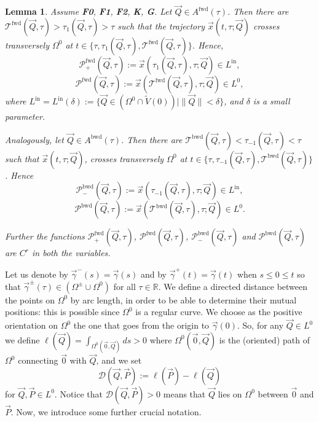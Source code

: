 \documentclass[10pt]{article}
\newtheorem{knownlemma}[knowntheorem]{Lemma}
\numberwithin{equation}{section}
\def\dist{{\mathscr{D}}}
\def\ga{\vec{\gamma}}
\def\de{\delta}
\def\Om{\Omega}
\def\R{{\mathbb R}}
\def\Q{\vec{Q}}
\def\P{\vec{P}}
\def\x{\vec{x}}
\newcommand\assump[1]{{\rm\textbf{#1}}}
\def\inn{\textrm{in}}
\theoremstyle{definition}
\theoremstyle{remark}
\begin{document}
    \begin{knownlemma}\label{L.loop}\cite[Lemma 3.6]{CFPRimut}
  Assume \assump{F0}, \assump{F1}, \assump{F2}, \assump{K}, \assump{G}.
    Let $\Q \in A^{\textrm{fwd}}(\tau)$. Then there are $\mathscr{T}^{\textrm{fwd}}(\Q,\tau)>\tau_1(\Q,\tau)>\tau$ such that
    the trajectory $\x(t,\tau; \Q) $
      crosses transversely $\Om^0$ at $t\in\{\tau, \tau_1(\Q,\tau), \mathscr{T}^{\textrm{fwd}}(\Q,\tau)\}$.
     Hence,
     $$\mathscr{P}^{\textrm{fwd}}_+(\Q,\tau):=\x(\tau_1(\Q,\tau),\tau; \Q) \in L^{\inn},$$
     $$\mathscr{P}^{\textrm{fwd}}(\Q,\tau):=\x(\mathscr{T}^{\textrm{fwd}}(\Q,\tau),\tau; \Q) \in
   L^0,$$
     where $L^{\inn}=L^{\inn}(\de):=\{\Q\in(\Om^0\cap\tilde{V}(0))\mid \|\Q\|<\de\}$, and $\de$ is a small parameter.

    Analogously, let $\Q \in A^{\textrm{bwd}}(\tau)$. Then there are $\mathscr{T}^{\textrm{bwd}}(\Q,\tau)<\tau_{-1}(\Q,\tau)<\tau$ such that
    $\x(t,\tau; \Q) $,
    crosses transversely $\Om^0$ at $t\in\{\tau, \tau_{-1}(\Q,\tau), \mathscr{T}^{\textrm{bwd}}(\Q,\tau)\}$. Hence
     $$ \mathscr{P}^{\textrm{bwd}}_-(\Q,\tau):=\x(\tau_{-1}(\Q,\tau),\tau; \Q) \in L^{\inn},$$
     $$ \mathscr{P}^{\textrm{bwd}}(\Q,\tau):=\x(\mathscr{T}^{\textrm{bwd}}(\Q,\tau),\tau; \Q) \in
    L^0.$$

     Further the functions $\mathscr{P}^{\textrm{fwd}}_+(\Q,\tau)$, $\mathscr{P}^{\textrm{fwd}}(\Q,\tau)$, $ \mathscr{P}^{\textrm{bwd}}_-(\Q,\tau)$
     and $ \mathscr{P}^{\textrm{bwd}}(\Q,\tau)$ are $C^r$ in both the variables.
  \end{knownlemma}



Let us denote by $\ga^-(s)=\ga(s)$ and  by $\ga^+(t)=\ga(t)$ when $s \le 0 \le t$ so that
$\ga^{\pm}(\tau) \in (\Omega^\pm \cup \Omega^0)$ for all $\tau\in\R$.
We define a directed distance between the points on $\Om^0$ by arc length, in order to be able to determine their mutual positions:
this is possible since $\Om^0$ is a regular curve.
We choose as the positive orientation on $\Om^0$ the one that goes from the origin to $\ga(0)$.
So, for any $\Q\in L^0$ we define
$\ell(\Q)=\int_{\Om^0(\vec{0},\Q)}ds>0$ where $\Om^0(\vec{0},\Q)$ is the (oriented) path of $\Om^0$ connecting $\vec{0}$ with $\Q$,
and we set
\begin{equation}\label{dist}
    \dist(\Q,\P):= \ell(\P)-\ell(\Q)
\end{equation}
for $\Q,\P\in L^0$.
Notice that $\dist(\Q,\P)>0$
 means that $\Q$ lies on $\Om^0$ between $\vec{0}$ and $\P$.
Now, we introduce some further crucial notation.
\end{document}
